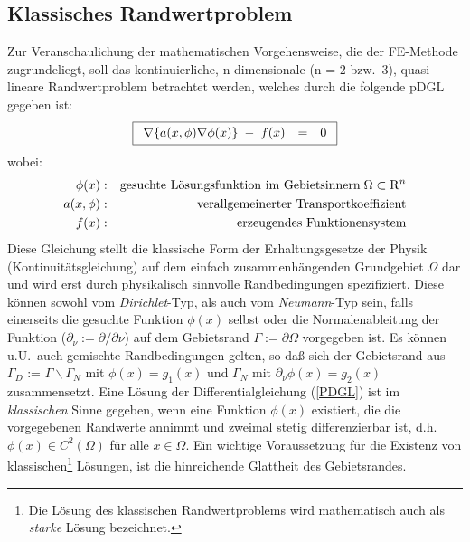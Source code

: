 \subsection{Klassisches Randwertproblem}
\label{klassRWP}

Zur Veranschaulichung der mathematischen Vorgehensweise, die der FE-Methode
zugrundeliegt, soll das kontinuierliche, n-dimensionale (n = 2 bzw.\ 3),
quasi-lineare Randwertproblem betrachtet werden, welches durch die
folgende pDGL gegeben ist:
\begin{equation}
\label{PDGL}
\fbox{$
 \displaystyle
 \begin{array}{rcl}
 \nabla \{ a(x,\phi) \nabla \phi(x) \} \; - \; f(x) & = & 0
 \end{array}
 $}
\end{equation}
wobei:
\begin{eqnarray*}
 \phi(x) & : & \mbox{gesuchte Lösungsfunktion im Gebietsinnern}
	    \; \Omega \subset {\rm R}^{n}\\
 a(x,\phi) & : & \mbox{verallgemeinerter Transportkoeffizient}\\
 f(x) & : & \mbox{erzeugendes Funktionensystem}
\end{eqnarray*}
Diese Gleichung stellt die klassische Form der Erhaltungsgesetze der Physik
(Kontinuitätsgleichung) auf dem einfach zusammenhängenden Grundgebiet
$\Omega$ dar und wird erst durch physikalisch sinnvolle Randbedingungen
spezifiziert. Diese können sowohl vom {\sl Dirichlet}-Typ, als auch vom
{\sl Neumann}-Typ sein, falls einerseits die gesuchte Funktion $\phi(x)$
selbst oder die Normalenableitung der Funktion
($\partial_{\nu} := \partial / \partial \nu$) auf dem Gebietsrand
$\Gamma := \partial \Omega$
vorgegeben ist. Es können u.U.\ auch gemischte Randbedingungen gelten, so
daß sich der Gebietsrand aus $\Gamma_{D}$ := $\Gamma \backslash \Gamma_{N}$
mit $\phi(x) = g_{1}(x)$ und $\Gamma_{N}$ mit
$\partial_{\nu} \phi(x)= g_{2}(x)$ zusammensetzt.
Eine Lösung der Differentialgleichung (\ref{PDGL}) ist im {\em klassischen}
Sinne gegeben, wenn eine Funktion $\phi(x)$ existiert, die die vorgegebenen
Randwerte annimmt und zweimal stetig differenzierbar ist, d.h.\
$\phi(x) \in C^{2}(\Omega)$ für alle $x \in \Omega$. Ein wichtige
Voraussetzung für die Existenz von klassischen\footnote{Die Lösung des
klassischen Randwertproblems wird mathematisch auch als
 {\em starke} Lösung bezeichnet.}
Lösungen, ist die hinreichende Glattheit des Gebietsrandes.


